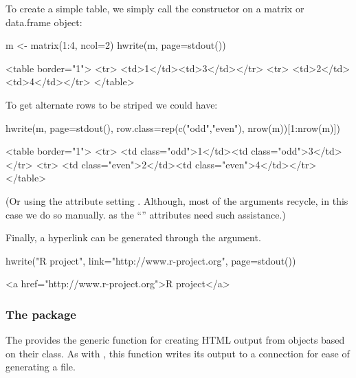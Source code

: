 To create a simple table, we simply call the constructor on a matrix or
data.frame object:
\begin{Schunk}
\begin{Sinput}
 m <- matrix(1:4, ncol=2)
 hwrite(m, page=stdout())
\end{Sinput}
\begin{Soutput}
<table border="1">
<tr>
<td>1</td><td>3</td></tr>
<tr>
<td>2</td><td>4</td></tr>
</table>
\end{Soutput}
\end{Schunk}


To get alternate rows to be striped we could have:
\begin{Schunk}
\begin{Sinput}
 hwrite(m, page=stdout(), 
        row.class=rep(c("odd","even"), nrow(m))[1:nrow(m)])
\end{Sinput}
\begin{Soutput}
<table border="1">
<tr>
<td class="odd">1</td><td class="odd">3</td></tr>
<tr>
<td class="even">2</td><td class="even">4</td></tr>
</table>
\end{Soutput}
\end{Schunk}

(Or using the  attribute setting
. Although, most of the
 arguments recycle, in this case we do so
manually. as the ``'' attributes need such assistance.)


Finally, a hyperlink can be generated through the  argument.
\begin{Schunk}
\begin{Sinput}
 hwrite("R project", link="http://www.r-project.org",
        page=stdout())
\end{Sinput}
\begin{Soutput}
<a href="http://www.r-project.org">R project</a>
\end{Soutput}
\end{Schunk}

\subsubsection{The  package}
\label{sec:pkgr2html-package}

The  provides the generic function  for
creating HTML output from \R\/ objects based on their class.  As with
, this function writes its output to a connection for ease of
generating a file.


